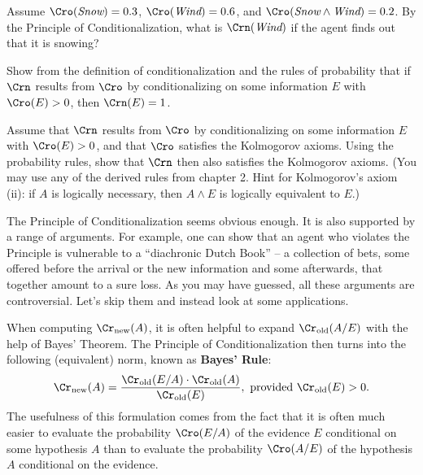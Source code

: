 \begin{exercise}{1}
  Assume $\Cro(\emph{Snow}) = 0.3$, $\Cro(\emph{Wind}) = 0.6$, and
  $\Cro(\emph{Snow} \land \emph{Wind}) = 0.2$. By the Principle of
  Conditionalization, what is $\Crn(\emph{Wind})$ if the agent finds
  out that it is snowing? 
\end{exercise}


\begin{exercise}{2}
  Show from the definition of conditionalization and the rules of
  probability that if $\Crn$ results from $\Cro$ by conditionalizing
  on some information $E$ with $\Cro(E) > 0$, then $\Crn(E) = 1$.
\end{exercise}



\begin{exercise}{3}
  Assume that $\Crn$ results from $\Cro$ by conditionalizing on some
  information $E$ with $\Cro(E) > 0$, and that $\Cro$ satisfies the
  Kolmogorov axioms. Using the probability rules, show that $\Crn$
  then also satisfies the Kolmogorov axioms. (You may use any of the
  derived rules from chapter 2. Hint for Kolmogorov's axiom (ii): if
  $A$ is logically necessary, then $A\land E$ is logically equivalent
  to $E$.)
\end{exercise}


The Principle of Conditionalization seems obvious enough. It is also
supported by a range of arguments. For example, one can show that an
agent who violates the Principle is vulnerable to a ``diachronic Dutch
Book'' -- a collection of bets, some offered before the arrival or the
new information and some afterwards, that together amount to a sure
loss. As you may have guessed, all these arguments are
controversial. Let's skip them and instead look at some applications.

When computing $\Cr_\text{new}(A)$, it is often helpful to expand
$\Cr_\text{old}(A/E)$ with the help of Bayes' Theorem. The Principle
of Conditionalization then turns into the following (equivalent) norm,
known as \textbf{Bayes' Rule}:
%
\[
\Cr_{\text{new}}(A) = \frac{\Cr_{\text{old}}(E/A) \cdot \Cr_{\text{old}}(A)}{\Cr_{\text{old}}(E)}, \text{ provided $\Cr_\text{old}(E) > 0$}.
\]
%
The usefulness of this formulation comes from the fact that it is
often much easier to evaluate the probability $\Cro(E/A)$ of the
evidence $E$ conditional on some hypothesis $A$  than to
evaluate the probability $\Cro(A/E)$ of the hypothesis $A$ conditional
on the evidence.

